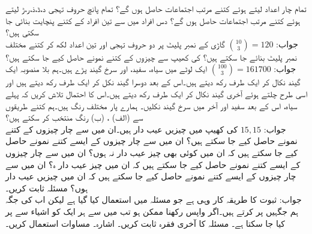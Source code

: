 \quad
تمام چار اعداد   لیتے ہوئے  کتنے مرتب اجتماعات حاصل ہوں گے؟
\quad
تمام پانچ حروف تہجی د،ڈ،ذ،ر،ڑ لیتے ہوئے کتنے مرتب اجتماعات حاصل ہوں گے؟ 
\quad
دس افراد میں سے تین افراد کے کتنے پنچایت بنائی جا سکتی ہیں؟ \\
جواب:\quad
$\binom{10}{3}=120$ 
\quad
گاڑی کے نمبر پلیٹ پر دو حروف تہجی اور تین اعداد لکھ کر کتنے مختلف نمبر پلیٹ بنائے جا سکتے ہیں؟
\quad
{} کی کھیپ سے  چیزوں کے کتنے  نمونے حاصل کیے جا سکتے ہیں؟\\
 جواب:\quad
$\binom{100}{3}=\num{161700}$
\quad
ایک لوٹے میں  سیاہ،  سفید، اور  سرخ گیند پڑے ہیں۔ہم بلا منصوبہ ایک گیند نکال کر ایک طرف رکھ دیتے ہیں۔اس کے بعد دوسرا گیند نکل کر ایک طرف رکھ دیتے ہیں اور اسی طرح چلتے ہوئے آخری گیند نکال کر ایک طرف رکھ دیتے ہیں۔اس کا احتمال تلاش کریں کہ پہلے  سیاہ، اس کے بعد  سفید اور آخر میں  سرخ گیند نکلیں۔
\quad
ہمارے پار  مختلف رنگ ہیں۔ہم کتنے طریقوں سے (الف) ، (ب)  رنگ منتخب کر سکتے ہیں؟\\
جواب:\quad
$15,15$
\quad
{} کی کھیپ میں  چیزیں عیب دار ہیں۔ان میں سے چار چیزوں کے کتنے نمونے حاصل کیے جا سکتے ہیں؟ ان میں سے چار چیزوں کے ایسے کتنے نمونے حاصل کیے جا سکتے ہیں کہ ان میں کوئی بھی چیز عیب دار نہ ہوں؟  ان میں سے چار چیزوں کے ایسے کتنے نمونے حاصل کیے جا سکتے ہیں کہ ان میں  چیز عیب دار ہ؟  ان میں سے چار چیزوں کے ایسے کتنے نمونے حاصل کیے جا سکتے ہیں کہ ان میں  چیزیں عیب دار ہوں؟  
\quad
مسئلہ  ثابت کریں۔\\
جواب:\quad
ثبوت کا طریقہ کار وہی ہے جو مسئلہ  میں استعمال کیا گیا ہے لیکن اب  کی جگہ ہم  جگہیں پر کرتے ہیں۔اگر واپس رکھنا ممکن ہو تب  میں سے ہر ایک کو  اشیاء  سے پر کیا جا سکتا ہے۔
\quad
مسئلہ  کا آخری فقرہ ثابت کریں۔ اشارہ۔ مساوات  استعمال کریں۔
